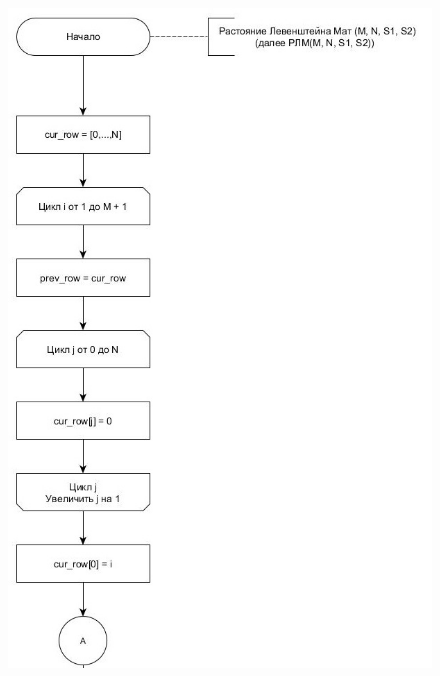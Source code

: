 \documentclass[12pt]{report}
\begin{document}
\clearpage
\begin{figure}[h]
	\centering
	\includegraphics[scale=0.65]{matr_lev11.jpg}

	\label{fig:mpr}
\end{figure}
\clearpage
\end{document}
